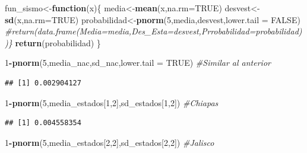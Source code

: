 \documentclass[
]{article}
\newenvironment{Shaded}{\begin{snugshade}}{\end{snugshade}}
\newcommand{\AttributeTok}[1]{\textcolor[rgb]{0.13,0.29,0.53}{#1}}
\newcommand{\CommentTok}[1]{\textcolor[rgb]{0.56,0.35,0.01}{\textit{#1}}}
\newcommand{\ConstantTok}[1]{\textcolor[rgb]{0.56,0.35,0.01}{#1}}
\newcommand{\ControlFlowTok}[1]{\textcolor[rgb]{0.13,0.29,0.53}{\textbf{#1}}}
\newcommand{\DecValTok}[1]{\textcolor[rgb]{0.00,0.00,0.81}{#1}}
\newcommand{\FunctionTok}[1]{\textcolor[rgb]{0.13,0.29,0.53}{\textbf{#1}}}
\newcommand{\NormalTok}[1]{#1}
\newcommand{\OtherTok}[1]{\textcolor[rgb]{0.56,0.35,0.01}{#1}}
\newcommand{\SpecialCharTok}[1]{\textcolor[rgb]{0.81,0.36,0.00}{\textbf{#1}}}
\begin{document}
\begin{Shaded}
\begin{Highlighting}[]
\NormalTok{fun\_sismo}\OtherTok{\textless{}{-}}\ControlFlowTok{function}\NormalTok{(x)\{}
\NormalTok{  media}\OtherTok{\textless{}{-}}\FunctionTok{mean}\NormalTok{(x,}\AttributeTok{na.rm=}\ConstantTok{TRUE}\NormalTok{)}
\NormalTok{  desvest}\OtherTok{\textless{}{-}}\FunctionTok{sd}\NormalTok{(x,}\AttributeTok{na.rm=}\ConstantTok{TRUE}\NormalTok{)}
\NormalTok{  probabilidad}\OtherTok{\textless{}{-}}\FunctionTok{pnorm}\NormalTok{(}\DecValTok{5}\NormalTok{,media,desvest,}\AttributeTok{lower.tail =} \ConstantTok{FALSE}\NormalTok{)}
  \CommentTok{\#return(data.frame(Media=media,Des\_Esta=desvest,Prrobabilidad=probabilidad))\}}
  \FunctionTok{return}\NormalTok{(probabilidad) \}}
\end{Highlighting}
\end{Shaded}

\begin{Shaded}
\begin{Highlighting}[]
\DecValTok{1}\SpecialCharTok{{-}}\FunctionTok{pnorm}\NormalTok{(}\DecValTok{5}\NormalTok{,media\_nac,sd\_nac,}\AttributeTok{lower.tail =} \ConstantTok{TRUE}\NormalTok{) }\CommentTok{\#Similar al anterior}
\end{Highlighting}
\end{Shaded}

\begin{verbatim}
## [1] 0.002904127
\end{verbatim}

\begin{Shaded}
\begin{Highlighting}[]
\DecValTok{1}\SpecialCharTok{{-}}\FunctionTok{pnorm}\NormalTok{(}\DecValTok{5}\NormalTok{,media\_estados[}\DecValTok{1}\NormalTok{,}\DecValTok{2}\NormalTok{],sd\_estados[}\DecValTok{1}\NormalTok{,}\DecValTok{2}\NormalTok{]) }\CommentTok{\#Chiapas}
\end{Highlighting}
\end{Shaded}

\begin{verbatim}
## [1] 0.004558354
\end{verbatim}

\begin{Shaded}
\begin{Highlighting}[]
\DecValTok{1}\SpecialCharTok{{-}}\FunctionTok{pnorm}\NormalTok{(}\DecValTok{5}\NormalTok{,media\_estados[}\DecValTok{2}\NormalTok{,}\DecValTok{2}\NormalTok{],sd\_estados[}\DecValTok{2}\NormalTok{,}\DecValTok{2}\NormalTok{]) }\CommentTok{\#Jalisco}
\end{Highlighting}
\end{Shaded}
\end{document}
